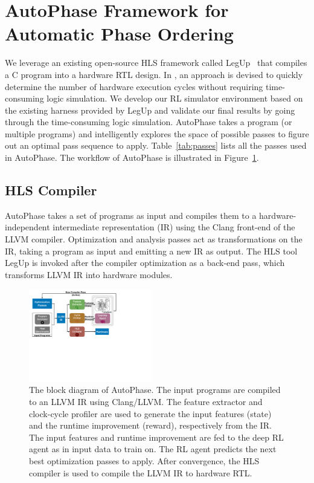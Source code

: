 \section{AutoPhase Framework for Automatic Phase Ordering} 
\label{sec:framework}

We leverage an existing open-source HLS framework called LegUp~\cite{canis2013legup} that compiles a C program into a hardware RTL design. 
In \cite{huang2013effect}, an approach is devised to quickly determine the number of hardware execution cycles without requiring time-consuming logic simulation.
We develop our RL simulator environment based on the existing harness provided by LegUp and validate our final results by going through the time-consuming logic simulation. AutoPhase takes a program (or multiple programs) and intelligently explores the space of possible passes to figure out an optimal pass sequence to apply. Table~\ref{tab:passes} lists all the passes used in AutoPhase. The workflow of AutoPhase is illustrated in Figure~\ref{fig:framework}.


\subsection{HLS Compiler}
AutoPhase takes a set of programs as input and compiles them 
to a hardware-independent intermediate representation (IR) using the Clang front-end of the LLVM compiler. Optimization and analysis passes act as transformations on the IR, taking a program as input and emitting a new IR as output. The HLS tool LegUp is invoked after the compiler optimization as a back-end pass, which transforms LLVM IR into hardware modules.
\begin{figure}[t!]
    \centering
    \includegraphics[width=0.48\textwidth]{Figures/Framework.pdf}
    \caption{The block diagram of AutoPhase. The input programs are compiled to an LLVM IR using Clang/LLVM. The feature extractor and clock-cycle profiler are used to generate the input features (state) and the runtime improvement (reward), respectively from the IR. The input features and runtime improvement are fed to the deep RL agent as in input data to train on. The RL agent predicts the next best optimization passes to apply. After convergence, the HLS compiler is used to compile the LLVM IR to hardware RTL.}
    \label{fig:framework}
    \vspace{-0.5cm}
\end{figure}
